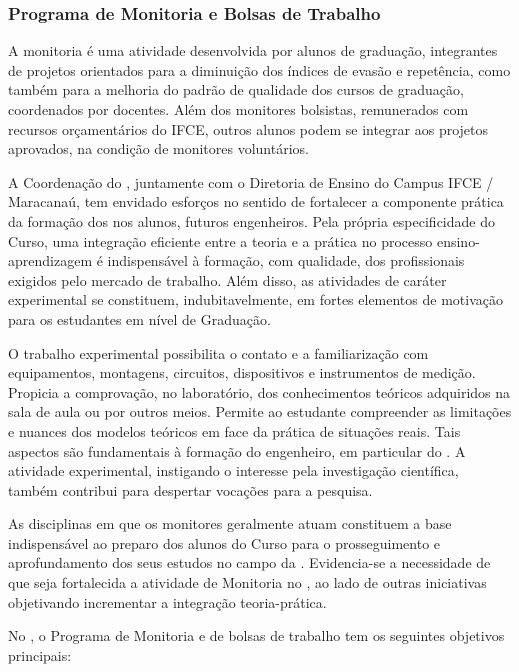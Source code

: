 \subsubsection{Programa de Monitoria e Bolsas de Trabalho}

A monitoria é uma atividade desenvolvida por alunos de graduação, integrantes de projetos orientados para a diminuição dos índices de evasão e repetência, como também para a melhoria do padrão de qualidade dos cursos de graduação, coordenados por docentes. Além dos monitores bolsistas, remunerados com recursos orçamentários do IFCE, outros alunos podem se integrar aos projetos aprovados, na condição de monitores voluntários.

A Coordenação do \NOMECURSO, juntamente com o Diretoria de Ensino do Campus IFCE / Maracanaú, tem envidado esforços no sentido de fortalecer a componente prática da formação dos nos alunos, futuros engenheiros. Pela própria especificidade do Curso, uma integração eficiente entre a teoria e a prática no processo ensino-aprendizagem é indispensável à formação, com qualidade, dos profissionais exigidos pelo mercado de trabalho. Além disso, as atividades de caráter experimental se constituem, indubitavelmente, em fortes elementos de motivação para os estudantes em nível de Graduação.

O trabalho experimental possibilita o contato e a familiarização com equipamentos, montagens, circuitos, dispositivos e instrumentos de medição. Propicia a comprovação, no laboratório, dos conhecimentos teóricos adquiridos na sala de aula ou por outros meios. Permite ao estudante compreender as limitações e nuances dos modelos teóricos em face da prática de situações reais. Tais aspectos são fundamentais à formação do engenheiro, em particular do \NOMEEGRESSO. A atividade  experimental, instigando o interesse pela investigação científica, também contribui para despertar vocações para a pesquisa.

As disciplinas em que os monitores geralmente atuam constituem a base indispensável ao preparo dos alunos do Curso para o prosseguimento e aprofundamento dos seus estudos no campo da \NOMEENG. Evidencia-se a necessidade de que seja fortalecida a atividade de Monitoria no \NOMECURSO, ao lado de outras iniciativas objetivando incrementar a integração teoria-prática.

No \NOMECURSO, o Programa de Monitoria e de bolsas de trabalho tem os seguintes objetivos principais:

